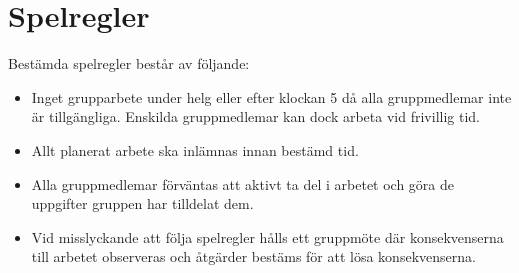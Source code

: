 \documentclass[a4paper]{article}
\begin{document}

\section{Spelregler}
\label{sec:spelregler}

Bestämda spelregler består av följande:

\begin{itemize}
\item Inget grupparbete under helg eller efter klockan 5 då alla gruppmedlemar inte är tillgängliga. Enskilda gruppmedlemar kan dock arbeta vid frivillig tid. 
\item Allt planerat arbete ska inlämnas innan bestämd tid.
\item Alla gruppmedlemar förväntas att aktivt ta del i arbetet och göra de uppgifter gruppen har tilldelat dem.
\item Vid misslyckande att följa spelregler hålls ett gruppmöte där konsekvenserna till arbetet observeras och åtgärder bestäms för att lösa konsekvenserna.
\end{itemize}

\end{document}
